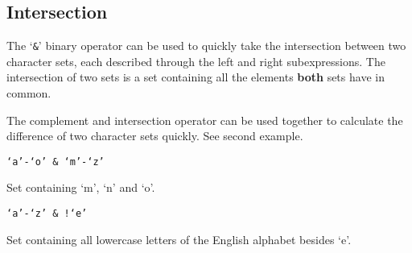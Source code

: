 
\subsection{Intersection}
{
	The `\texttt{\&}' binary operator can be used to quickly take the
	intersection between two character sets, each described through
	the left and right subexpressions. The intersection of two sets is
	a set containing all the elements \textbf{both} sets have in common.
	
	The complement and intersection operator can be used together to calculate
	the difference of two character sets quickly. See second example.
	
	\begin{itemize}
	{
		\item[] \texttt{`a'-`o' \& `m'-`z'}
		
			Set containing `m', `n' and `o'.
		
		\item[] \texttt{`a'-`z' \& !{}`e'}
		
			Set containing all lowercase letters
			of the English alphabet besides `e'.
	}
	\end{itemize}
}
